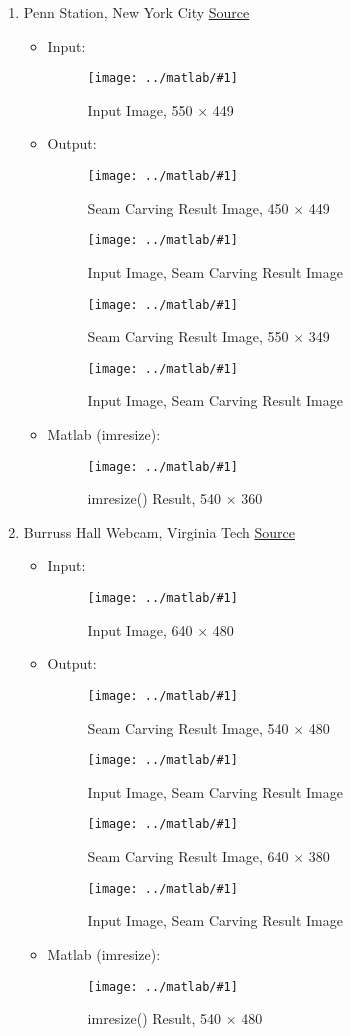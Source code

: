 \documentclass{article}
\newcommand{\listFigure}[3]{ \begin{figure}[H]
\texttt{[image: ../matlab/\#1]}
		\caption{#2\label{fig:#3}}
	\end{figure}		
}
\begin{document}
\begin{enumerate}
\begin{enumerate}
		\item Penn Station, New York City
		\href{http://animalnewyork.com/2013/awesome-map/}{Source} \\ 
		\begin{itemize}
			\item Input:
			\listFigure{PennStation/inputPennStation.jpg}{Input Image, 550 $\times$
			449}{inputManhattan}
			\item Output:
			\listFigure{PennStation/outputPennStationW.png}{Seam Carving Result Image,
			450 $\times$ 449}{outputManhattanW} 
			\listFigure{PennStation/outputIOW.png}{Input Image, Seam Carving
			Result Image}{outputManhattanIOW}
			\listFigure{PennStation/outputPennStationH.png}{Seam Carving Result Image,
			550 $\times$ 349}{outputManhattanH} 
			\listFigure{PennStation/outputIOH.png}{Input Image, Seam Carving
			Result Image}{outputManhattanIOH}
			\item Matlab (imresize): 
			\listFigure{PennStation/outputPennStationMatlab.png}{imresize() Result, 540
			$\times$ 360}{outputPennStationMatlab}
		\end{itemize}
		
		\item Burruss Hall Webcam, Virginia Tech
		\href{https://www.vtnews.vt.edu/webcams/burruss.html}{Source} \\
		\begin{itemize}
			\item Input: 
			\listFigure{BurrussHall/inputBurrussHall.jpg}{Input Image, 640 $\times$
			480}{inputManhattan}
			\item Output:
			\listFigure{BurrussHall/outputBurrussHallW.png}{Seam Carving Result Image,
			540 $\times$ 480}{outputBurrussHallW} 
			\listFigure{BurrussHall/outputIOW.png}{Input Image, Seam Carving
			Result Image}{outputBurrussHallIOW}
			\listFigure{BurrussHall/outputBurrussHallH.png}{Seam Carving Result Image,
			640 $\times$ 380}{outputBurrussHallH} 
			\listFigure{BurrussHall/outputIOH.png}{Input Image, Seam Carving
			Result Image}{outputBurrussHallIOH}
			\item Matlab (imresize): 
			\listFigure{BurrussHall/outputBurrussHallMatlab.png}{imresize() Result, 540
			$\times$ 480}{outputBurrussHallMatlab}
		\end{itemize}
	\end{enumerate}
\end{enumerate}
\pagebreak

\label{Extra Credit}
\end{document}
